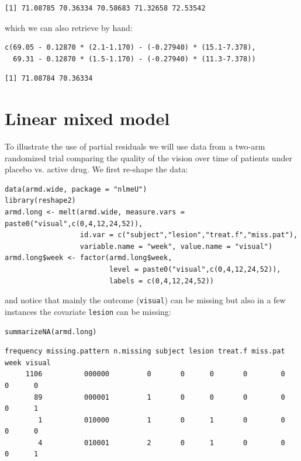 \documentclass[12pt]{article}
\begin{document}
\begin{verbatim}
[1] 71.08785 70.36334 70.58683 71.32658 72.53542
\end{verbatim}


which we can also retrieve by hand:
\lstset{language=r,label= ,caption= ,captionpos=b,numbers=none}
\begin{lstlisting}
c(69.05 - 0.12870 * (2.1-1.170) - (-0.27940) * (15.1-7.378),
  69.31 - 0.12870 * (1.5-1.170) - (-0.27940) * (11.3-7.378))
\end{lstlisting}

\begin{verbatim}
[1] 71.08784 70.36334
\end{verbatim}



\clearpage

\section{Linear mixed model}
\label{sec:org4437425}

To illustrate the use of partial residuals we will use data from a
two-arm randomized trial comparing the quality of the vision over time
of patients under placebo vs. active drug. We first re-shape the data:
\lstset{language=r,label= ,caption= ,captionpos=b,numbers=none}
\begin{lstlisting}
data(armd.wide, package = "nlmeU")
library(reshape2)
armd.long <- melt(armd.wide, measure.vars = paste0("visual",c(0,4,12,24,52)),
                  id.var = c("subject","lesion","treat.f","miss.pat"),
                  variable.name = "week", value.name = "visual")
armd.long$week <- factor(armd.long$week, 
                         level = paste0("visual",c(0,4,12,24,52)),
                         labels = c(0,4,12,24,52))
\end{lstlisting}

and notice that mainly the outcome (\texttt{visual}) can be missing but also
in a few instances the covariate \texttt{lesion} can be missing:
\lstset{language=r,label= ,caption= ,captionpos=b,numbers=none}
\begin{lstlisting}
summarizeNA(armd.long)
\end{lstlisting}

\begin{verbatim}
frequency missing.pattern n.missing subject lesion treat.f miss.pat week visual
     1106          000000         0       0      0       0        0    0      0
       89          000001         1       0      0       0        0    0      1
        1          010000         1       0      1       0        0    0      0
        4          010001         2       0      1       0        0    0      1
\end{verbatim}
\end{document}
